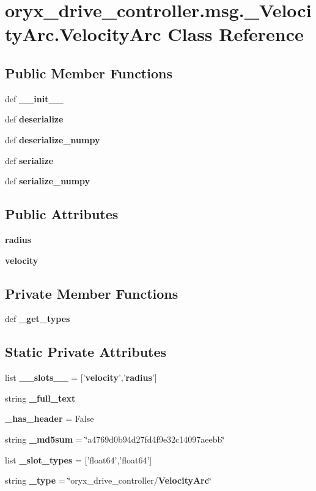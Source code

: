 \section{oryx\-\_\-drive\-\_\-controller.\-msg.\-\_\-\-Velocity\-Arc.\-Velocity\-Arc \-Class \-Reference}
\label{classoryx__drive__controller_1_1msg_1_1__VelocityArc_1_1VelocityArc}
\subsection*{\-Public \-Member \-Functions}
\begin{DoxyCompactItemize}
\item 
def {\bf \-\_\-\-\_\-init\-\_\-\-\_\-}
\item 
def {\bf deserialize}
\item 
def {\bf deserialize\-\_\-numpy}
\item 
def {\bf serialize}
\item 
def {\bf serialize\-\_\-numpy}
\end{DoxyCompactItemize}
\subsection*{\-Public \-Attributes}
\begin{DoxyCompactItemize}
\item 
{\bf radius}
\item 
{\bf velocity}
\end{DoxyCompactItemize}
\subsection*{\-Private \-Member \-Functions}
\begin{DoxyCompactItemize}
\item 
def {\bf \-\_\-get\-\_\-types}
\end{DoxyCompactItemize}
\subsection*{\-Static \-Private \-Attributes}
\begin{DoxyCompactItemize}
\item 
list {\bf \-\_\-\-\_\-slots\-\_\-\-\_\-} = ['{\bf velocity}','{\bf radius}']
\item 
string {\bf \-\_\-full\-\_\-text}
\item 
{\bf \-\_\-has\-\_\-header} = \-False
\item 
string {\bf \-\_\-md5sum} = \char`\"{}a4769d0b94d27fd4f9e32c14097aeebb\char`\"{}
\item 
list {\bf \-\_\-slot\-\_\-types} = ['float64','float64']
\item 
string {\bf \-\_\-type} = \char`\"{}oryx\-\_\-drive\-\_\-controller/{\bf \-Velocity\-Arc}\char`\"{}
\end{DoxyCompactItemize}



